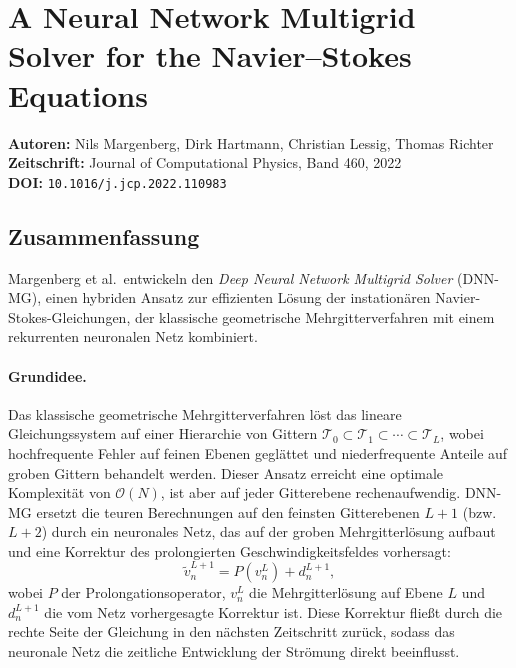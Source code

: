 \documentclass[a4paper,12pt]{article}
\begin{document}
\section*{A Neural Network Multigrid Solver for the Navier--Stokes Equations}

\textbf{Autoren:} Nils Margenberg, Dirk Hartmann, Christian Lessig, Thomas Richter \\
\textbf{Zeitschrift:} Journal of Computational Physics, Band 460, 2022 \\
\textbf{DOI:} \texttt{10.1016/j.jcp.2022.110983}

\subsection*{Zusammenfassung}

Margenberg et al.\ entwickeln den \emph{Deep Neural Network Multigrid Solver}
(DNN-MG), einen hybriden Ansatz zur effizienten Lösung der instationären
Navier-Stokes-Gleichungen, der klassische geometrische Mehrgitterverfahren mit
einem rekurrenten neuronalen Netz kombiniert.

\paragraph{Grundidee.}
Das klassische geometrische Mehrgitterverfahren löst das lineare Gleichungssystem
auf einer Hierarchie von Gittern $\mathcal{T}_0 \subset \mathcal{T}_1 \subset
\cdots \subset \mathcal{T}_L$, wobei hochfrequente Fehler auf feinen Ebenen
geglättet und niederfrequente Anteile auf groben Gittern behandelt werden.
Dieser Ansatz erreicht eine optimale Komplexität von $\mathcal{O}(N)$, ist aber
auf jeder Gitterebene rechenaufwendig. DNN-MG ersetzt die
teuren Berechnungen auf den feinsten Gitterebenen $L+1$ (bzw.\ $L+2$) durch
ein neuronales Netz, das auf der groben Mehrgitterlösung aufbaut und eine
Korrektur des prolongierten Geschwindigkeitsfeldes vorhersagt:
\begin{equation}
    \tilde{v}^{L+1}_n = P(v^L_n) + d^{L+1}_n,
\end{equation}
wobei $P$ der Prolongationsoperator, $v^L_n$ die Mehrgitterlösung auf Ebene $L$
und $d^{L+1}_n$ die vom Netz vorhergesagte Korrektur ist.
Diese Korrektur fließt durch die rechte Seite der Gleichung in den nächsten
Zeitschritt zurück, sodass das neuronale Netz die zeitliche Entwicklung der
Strömung direkt beeinflusst.
\end{document}
